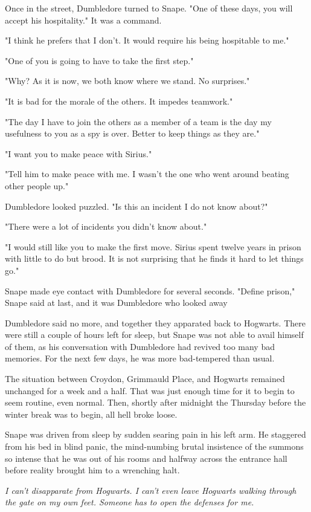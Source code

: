 \documentclass[a4paper,11pt]{article}
\begin{document}
Once in the street, Dumbledore turned to Snape. "One of these days, you will accept his hospitality." It was a command.

"I think he prefers that I don't. It would require his being hospitable to me."

"One of you is going to have to take the first step."

"Why? As it is now, we both know where we stand. No surprises."

"It is bad for the morale of the others. It impedes teamwork."

"The day I have to join the others as a member of a team is the day my usefulness to you as a spy is over. Better to keep things as they are."

"I want you to make peace with Sirius."

"Tell him to make peace with me. I wasn't the one who went around beating other people up."

Dumbledore looked puzzled. "Is this an incident I do not know about?"

"There were a lot of incidents you didn't know about."

"I would still like you to make the first move. Sirius spent twelve years in prison with little to do but brood. It is not surprising that he finds it hard to let things go."

Snape made eye contact with Dumbledore for several seconds. "Define prison," Snape said at last, and it was Dumbledore who looked away

Dumbledore said no more, and together they apparated back to Hogwarts. There were still a couple of hours left for sleep, but Snape was not able to avail himself of them, as his conversation with Dumbledore had revived too many bad memories. For the next few days, he was more bad-tempered than usual.

The situation between Croydon, Grimmauld Place, and Hogwarts remained unchanged for a week and a half. That was just enough time for it to begin to seem routine, even normal. Then, shortly after midnight the Thursday before the winter break was to begin, all hell broke loose.

Snape was driven from sleep by sudden searing pain in his left arm. He staggered from his bed in blind panic, the mind-numbing brutal insistence of the summons so intense that he was out of his rooms and halfway across the entrance hall before reality brought him to a wrenching halt.

\emph{I can't disapparate from Hogwarts. I can't even leave Hogwarts walking through the gate on my own feet. Someone has to open the defenses for me.}
\end{document}
